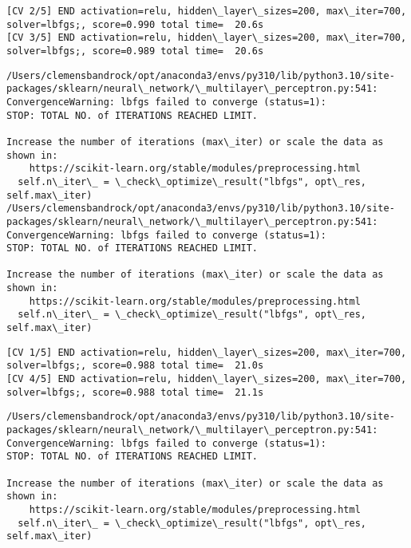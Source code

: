 \documentclass[11pt]{article}
\begin{document}
    \begin{Verbatim}[commandchars=\\\{\}]
[CV 2/5] END activation=relu, hidden\_layer\_sizes=200, max\_iter=700,
solver=lbfgs;, score=0.990 total time=  20.6s
[CV 3/5] END activation=relu, hidden\_layer\_sizes=200, max\_iter=700,
solver=lbfgs;, score=0.989 total time=  20.6s
    \end{Verbatim}

    \begin{Verbatim}[commandchars=\\\{\}]
/Users/clemensbandrock/opt/anaconda3/envs/py310/lib/python3.10/site-
packages/sklearn/neural\_network/\_multilayer\_perceptron.py:541:
ConvergenceWarning: lbfgs failed to converge (status=1):
STOP: TOTAL NO. of ITERATIONS REACHED LIMIT.

Increase the number of iterations (max\_iter) or scale the data as shown in:
    https://scikit-learn.org/stable/modules/preprocessing.html
  self.n\_iter\_ = \_check\_optimize\_result("lbfgs", opt\_res, self.max\_iter)
/Users/clemensbandrock/opt/anaconda3/envs/py310/lib/python3.10/site-
packages/sklearn/neural\_network/\_multilayer\_perceptron.py:541:
ConvergenceWarning: lbfgs failed to converge (status=1):
STOP: TOTAL NO. of ITERATIONS REACHED LIMIT.

Increase the number of iterations (max\_iter) or scale the data as shown in:
    https://scikit-learn.org/stable/modules/preprocessing.html
  self.n\_iter\_ = \_check\_optimize\_result("lbfgs", opt\_res, self.max\_iter)
    \end{Verbatim}

    \begin{Verbatim}[commandchars=\\\{\}]
[CV 1/5] END activation=relu, hidden\_layer\_sizes=200, max\_iter=700,
solver=lbfgs;, score=0.988 total time=  21.0s
[CV 4/5] END activation=relu, hidden\_layer\_sizes=200, max\_iter=700,
solver=lbfgs;, score=0.988 total time=  21.1s
    \end{Verbatim}

    \begin{Verbatim}[commandchars=\\\{\}]
/Users/clemensbandrock/opt/anaconda3/envs/py310/lib/python3.10/site-
packages/sklearn/neural\_network/\_multilayer\_perceptron.py:541:
ConvergenceWarning: lbfgs failed to converge (status=1):
STOP: TOTAL NO. of ITERATIONS REACHED LIMIT.

Increase the number of iterations (max\_iter) or scale the data as shown in:
    https://scikit-learn.org/stable/modules/preprocessing.html
  self.n\_iter\_ = \_check\_optimize\_result("lbfgs", opt\_res, self.max\_iter)
    \end{Verbatim}
\end{document}

